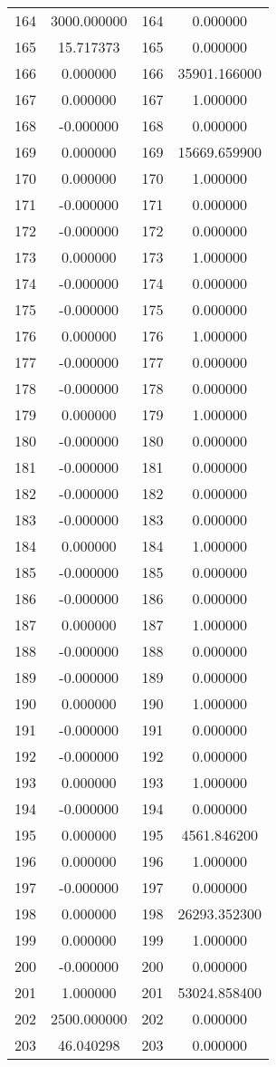 \documentclass[12pt]{article}
\begin{document}
\begin{longtable}{@{}cccc@{}}
164 & 3000.000000 & 164 & 0.000000 \\
165 & 15.717373 & 165 & 0.000000 \\
166 & 0.000000 & 166 & 35901.166000 \\
167 & 0.000000 & 167 & 1.000000 \\
168 & -0.000000 & 168 & 0.000000 \\
169 & 0.000000 & 169 & 15669.659900 \\
170 & 0.000000 & 170 & 1.000000 \\
171 & -0.000000 & 171 & 0.000000 \\
172 & -0.000000 & 172 & 0.000000 \\
173 & 0.000000 & 173 & 1.000000 \\
174 & -0.000000 & 174 & 0.000000 \\
175 & -0.000000 & 175 & 0.000000 \\
176 & 0.000000 & 176 & 1.000000 \\
177 & -0.000000 & 177 & 0.000000 \\
178 & -0.000000 & 178 & 0.000000 \\
179 & 0.000000 & 179 & 1.000000 \\
180 & -0.000000 & 180 & 0.000000 \\
181 & -0.000000 & 181 & 0.000000 \\
182 & -0.000000 & 182 & 0.000000 \\
183 & -0.000000 & 183 & 0.000000 \\
184 & 0.000000 & 184 & 1.000000 \\
185 & -0.000000 & 185 & 0.000000 \\
186 & -0.000000 & 186 & 0.000000 \\
187 & 0.000000 & 187 & 1.000000 \\
188 & -0.000000 & 188 & 0.000000 \\
189 & -0.000000 & 189 & 0.000000 \\
190 & 0.000000 & 190 & 1.000000 \\
191 & -0.000000 & 191 & 0.000000 \\
192 & -0.000000 & 192 & 0.000000 \\
193 & 0.000000 & 193 & 1.000000 \\
194 & -0.000000 & 194 & 0.000000 \\
195 & 0.000000 & 195 & 4561.846200 \\
196 & 0.000000 & 196 & 1.000000 \\
197 & -0.000000 & 197 & 0.000000 \\
198 & 0.000000 & 198 & 26293.352300 \\
199 & 0.000000 & 199 & 1.000000 \\
200 & -0.000000 & 200 & 0.000000 \\
201 & 1.000000 & 201 & 53024.858400 \\
202 & 2500.000000 & 202 & 0.000000 \\
203 & 46.040298 & 203 & 0.000000 \\

\end{longtable}
\end{document}
